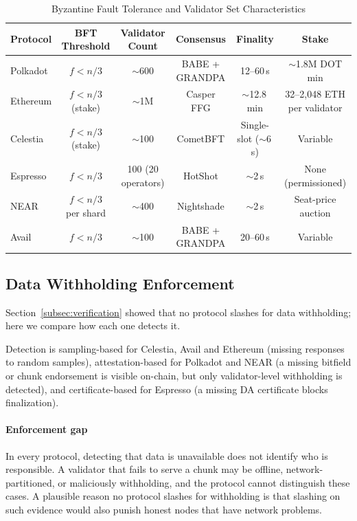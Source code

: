 \begin{table}[t]
\centering
\caption{Byzantine Fault Tolerance and Validator Set Characteristics}
\label{tab:bft_comparison}
\setlength{\tabcolsep}{3pt}
\footnotesize
\begin{tabular}{lccccc}
\toprule
\textbf{Protocol} & \textbf{BFT Threshold} & \textbf{Validator Count} & \textbf{Consensus} & \textbf{Finality} & \textbf{Stake} \\
\midrule
Polkadot & $f < n/3$ & $\sim$600 & BABE + GRANDPA & 12--60\,s & $\sim$1.8M DOT min \\
Ethereum & $f < n/3$ (stake) & $\sim$1M & Casper FFG & $\sim$12.8\,min & 32--2,048 ETH per validator \\
Celestia & $f < n/3$ (stake) & $\sim$100 & CometBFT & Single-slot ($\sim$6\,s) & Variable \\
Espresso & $f < n/3$ & 100 (20 operators) & HotShot & $\sim$2\,s & None (permissioned) \\
NEAR & $f < n/3$ per shard & $\sim$400 & Nightshade & $\sim$2\,s & Seat-price auction \\
Avail & $f < n/3$ & $\sim$100 & BABE + GRANDPA & 20--60\,s & Variable \\
\bottomrule
\end{tabular}
\end{table}

\subsection{Data Withholding Enforcement}
\label{sec:security-withholding}

Section~\ref{subsec:verification} showed that no protocol slashes for data withholding; here we compare how each one detects it.

Detection is sampling-based for Celestia, Avail and Ethereum (missing responses to random samples), attestation-based for Polkadot and NEAR (a missing bitfield or chunk endorsement is visible on-chain, but only validator-level withholding is detected), and certificate-based for Espresso (a missing DA certificate blocks finalization).

\paragraph{Enforcement gap}
In every protocol, detecting that data is unavailable does not identify who is responsible.
A validator that fails to serve a chunk may be offline, network-partitioned, or maliciously withholding, and the protocol cannot distinguish these cases.
A plausible reason no protocol slashes for withholding is that slashing on such evidence would also punish honest nodes that have network problems.

